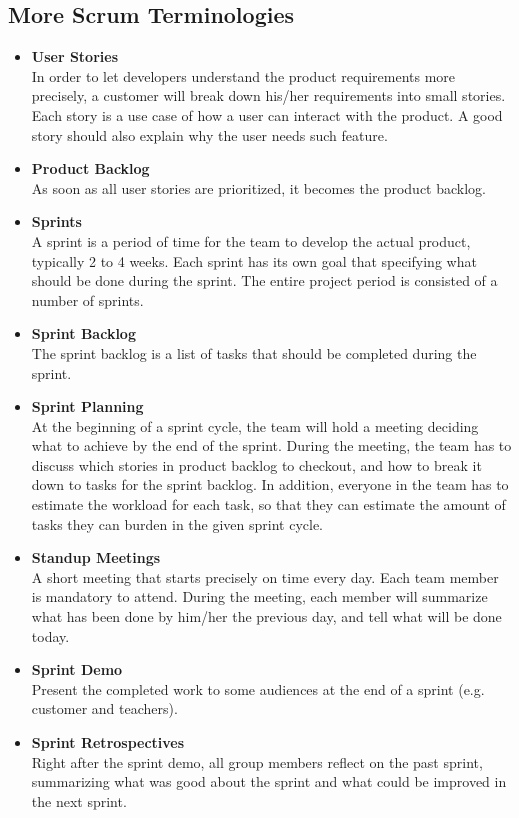 \documentclass[11pt,a4paper]{report}
\begin{document}
\subsection{More Scrum Terminologies}
\begin{itemize}
\item{\textbf{User Stories}}\\
In order to let developers understand the product requirements more
precisely, a customer will break down his/her requirements into small
stories.
Each story is a use case of how a user can interact with the product. A good
story should also explain why the user needs such feature.

\item{\textbf{Product Backlog}}\\
As soon as all user stories are prioritized, it becomes the
product backlog.

\item{\textbf{Sprints}}\\
A sprint is a period of time for the team to develop the actual
product, typically 2 to 4 weeks. Each sprint has its own goal that specifying
what should be done during the sprint. The entire project period
is consisted of a number of sprints.

\item{\textbf{Sprint Backlog}}\\
The sprint backlog is a list of tasks that should be completed during the sprint.

\item{\textbf{Sprint Planning}}\\
At the beginning of a sprint cycle, the team will hold a meeting
deciding what to achieve by the end of the sprint. During the meeting,
the team has to discuss which stories in product backlog to checkout,
and how to break it down to tasks for the sprint backlog. In addition,
everyone in the team has to estimate
the workload for each task, so that they can estimate the amount of
tasks they can burden in the given sprint cycle.

\item{\textbf{Standup Meetings}}\\
A short meeting that starts precisely on time every day.
Each team member is mandatory to attend. During the meeting, each
member will summarize what has been done by him/her the previous day,
and tell what will be done today.

\item{\textbf{Sprint Demo}}\\
Present the completed work to some audiences at the end of a sprint
(e.g. customer and teachers).

\item{\textbf{Sprint Retrospectives}}\\
Right after the sprint demo, all group members reflect on the past
sprint, summarizing what was good about the sprint and what could be
improved in the next sprint.

\end{itemize}
\end{document}
